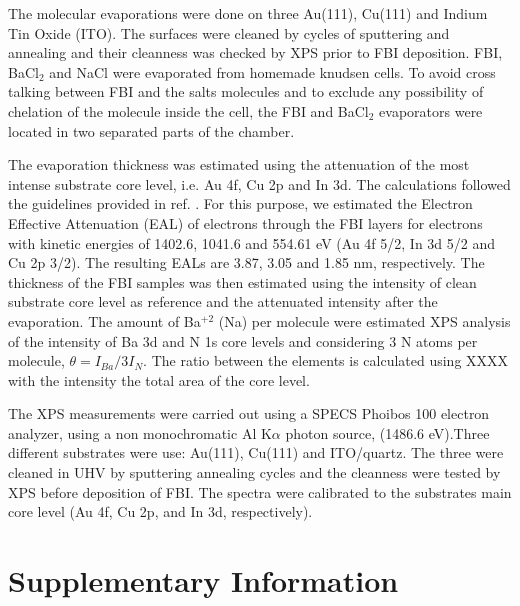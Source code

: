 \documentclass[aps,prl,reprint,longbibliography,superscriptaddress]{revtex4-1}
\def\BaCl{BaCl$_2$ }
\def\Ba{Ba$^{+2}$ }
\begin{document}
 The molecular evaporations were done on three Au(111), Cu(111) and Indium Tin Oxide (ITO). The surfaces were cleaned by cycles of sputtering and annealing and their cleanness was checked by XPS prior to FBI deposition. FBI, \BaCl and NaCl were evaporated from homemade knudsen cells. To avoid cross talking between FBI and the salts molecules and to exclude any possibility of chelation of the molecule inside the cell, the FBI and \BaCl  evaporators were located in two separated parts of the chamber.
 
The evaporation thickness was estimated using the attenuation of the most intense substrate core level, i.e. Au 4f, Cu 2p and In 3d. The calculations followed the guidelines provided in ref. \cite{powell_practical_2020}. For this purpose, we estimated the Electron Effective Attenuation (EAL) of electrons through the FBI layers for electrons with kinetic energies of 1402.6, 1041.6 and 554.61 eV (Au 4f 5/2, In 3d 5/2 and Cu 2p 3/2). The resulting EALs are 3.87, 3.05 and 1.85 nm, respectively. The thickness of the FBI samples was then estimated using the intensity of clean substrate core level as reference and the attenuated intensity after the evaporation.  The amount of \Ba (Na) per molecule were estimated XPS analysis  of the  intensity  of  Ba 3d  and  N 1s  core  levels  and considering 3 N atoms per molecule, $\theta=I_{Ba}/3I_N $.
The ratio between the elements is calculated using XXXX with the intensity the total area of the core level. 

The XPS measurements were carried out using a SPECS Phoibos 100 electron analyzer, using a non monochromatic Al K$\alpha$ photon source, (1486.6 eV).Three different substrates were use: Au(111), Cu(111) and  ITO/quartz. The three were cleaned in UHV by sputtering annealing cycles and the cleanness were tested by XPS before deposition of FBI. The spectra were calibrated to the substrates main core level (Au 4f, Cu 2p, and In 3d, respectively). 

 



\section{Supplementary Information}
\end{document}
